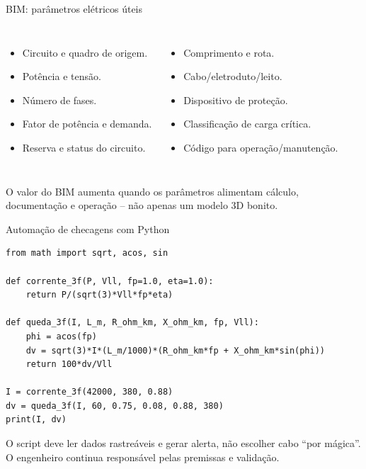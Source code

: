 \begin{frame}{BIM: parâmetros elétricos úteis}
\small
\begin{columns}[T,onlytextwidth]
\begin{itemize}
\item Circuito e quadro de origem.
\item Potência e tensão.
\item Número de fases.
\item Fator de potência e demanda.
\item Reserva e status do circuito.
\end{itemize}
\begin{itemize}
\item Comprimento e rota.
\item Cabo/eletroduto/leito.
\item Dispositivo de proteção.
\item Classificação de carga crítica.
\item Código para operação/manutenção.
\end{itemize}
\end{columns}
\begin{caixaObs}
O valor do BIM aumenta quando os parâmetros alimentam cálculo, documentação e operação -- não apenas um modelo 3D bonito.
\end{caixaObs}
\end{frame}

\begin{frame}[fragile]{Automação de checagens com Python}
\scriptsize
\begin{lstlisting}[style=codPy]
from math import sqrt, acos, sin

def corrente_3f(P, Vll, fp=1.0, eta=1.0):
    return P/(sqrt(3)*Vll*fp*eta)

def queda_3f(I, L_m, R_ohm_km, X_ohm_km, fp, Vll):
    phi = acos(fp)
    dv = sqrt(3)*I*(L_m/1000)*(R_ohm_km*fp + X_ohm_km*sin(phi))
    return 100*dv/Vll

I = corrente_3f(42000, 380, 0.88)
dv = queda_3f(I, 60, 0.75, 0.08, 0.88, 380)
print(I, dv)
\end{lstlisting}
\begin{caixaObs}
O script deve ler dados rastreáveis e gerar alerta, não escolher cabo ``por mágica''. O engenheiro continua responsável pelas premissas e validação.
\end{caixaObs}
\end{frame}

